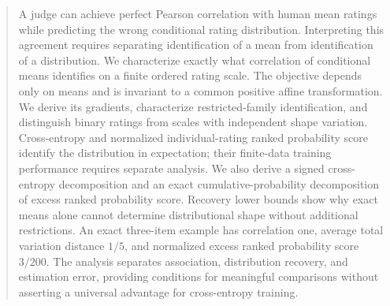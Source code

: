 \begin{abstract}
A judge can achieve perfect Pearson correlation with human mean ratings while predicting the wrong conditional rating distribution.
Interpreting this agreement requires separating identification of a mean from identification of a distribution.
We characterize exactly what correlation of conditional means identifies on a finite ordered rating scale.
The objective depends only on means and is invariant to a common positive affine transformation.
We derive its gradients, characterize restricted-family identification, and distinguish binary ratings from scales with independent shape variation.
Cross-entropy and normalized individual-rating ranked probability score identify the distribution in expectation; their finite-data training performance requires separate analysis.
We also derive a signed cross-entropy decomposition and an exact cumulative-probability decomposition of excess ranked probability score.
Recovery lower bounds show why exact means alone cannot determine distributional shape without additional restrictions.
An exact three-item example has correlation one, average total variation distance $1/5$, and normalized excess ranked probability score $3/200$.
The analysis separates association, distribution recovery, and estimation error, providing conditions for meaningful comparisons without asserting a universal advantage for cross-entropy training.
\end{abstract}
